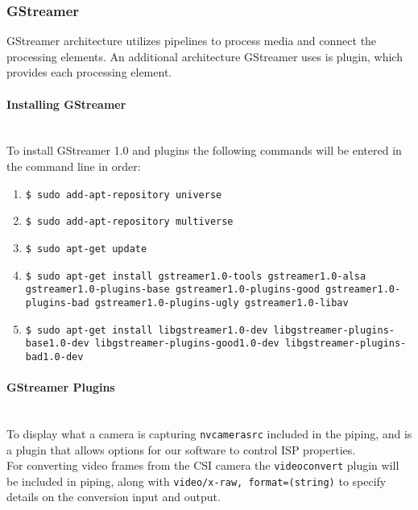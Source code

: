 \documentclass[letterpaper,10pt,serif,draftclsnofoot,onecolumn,compsoc,titlepage]{IEEEtran}
\begin{document}
\subsubsection{GStreamer}

GStreamer architecture utilizes pipelines to process media and connect the processing 
elements. An additional architecture GStreamer uses is plugin, which provides each 
processing element. \\

\paragraph{Installing GStreamer}\mbox{} \\ 

To install GStreamer 1.0 and plugins the following commands will be entered in the 
command line in order: \\

	\begin{enumerate}
		\item\texttt{\$ sudo add-apt-repository universe} \\
		\item\texttt{\$ sudo add-apt-repository multiverse} \\
		\item\texttt{\$ sudo apt-get update} \\
		\item\texttt{\$ sudo apt-get install gstreamer1.0-tools gstreamer1.0-alsa 
			gstreamer1.0-plugins-base \newline gstreamer1.0-plugins-good 
			gstreamer1.0-plugins-bad gstreamer1.0-plugins-ugly \newline
			gstreamer1.0-libav} \\
		\item\texttt{\$ sudo apt-get install libgstreamer1.0-dev libgstreamer-plugins-base1.0-dev \newline
		libgstreamer-plugins-good1.0-dev libgstreamer-plugins-bad1.0-dev} \\
	\end{enumerate}

\paragraph{GStreamer Plugins}\mbox{} \\ 

To display what a camera is capturing \texttt{nvcamerasrc} included in the piping, 
and is a plugin that allows options for our software to control ISP properties. \\

For converting video frames from the CSI camera the \texttt{videoconvert} plugin will 
be included in piping, along with \texttt{video/x-raw, format=(string){}} to specify 
details on the conversion input and output. \\


\nocite{*}
%
%
\end{document}
